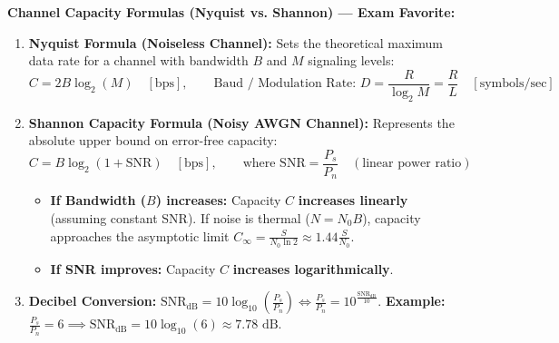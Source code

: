 \documentclass[10pt,a4paper]{article}
\begin{document}
\begin{tcolorbox}[
    colframe=accentgreen,
    colback=white,
    arc=1.2mm,
    boxrule=0.5pt,
    left=5pt, right=5pt, top=2.5pt, bottom=2.5pt
]
\textbf{Channel Capacity Formulas (Nyquist vs. Shannon) --- Exam Favorite:}
\begin{enumerate}[leftmargin=12pt, itemsep=1pt, topsep=1pt]
    \item \textbf{Nyquist Formula (Noiseless Channel):} Sets the theoretical maximum data rate for a channel with bandwidth $B$ and $M$ signaling levels:
    \[
    C = 2B \log_2(M) \quad [\text{bps}], \qquad \text{Baud / Modulation Rate: } D = \frac{R}{\log_2 M} = \frac{R}{L} \quad [\text{symbols/sec}]
    \]
    \item \textbf{Shannon Capacity Formula (Noisy AWGN Channel):} Represents the absolute upper bound on error-free capacity:
    \[
    C = B \log_2(1 + \text{SNR}) \quad [\text{bps}], \qquad \text{where } \text{SNR} = \frac{P_s}{P_n} \quad (\text{linear power ratio})
    \]
    \begin{itemize}[leftmargin=10pt, itemsep=0.5pt]
        \item \textbf{If Bandwidth ($B$) increases:} Capacity $C$ \textbf{increases linearly} (assuming constant SNR). If noise is thermal ($N = N_0 B$), capacity approaches the asymptotic limit $C_\infty = \frac{S}{N_0 \ln 2} \approx 1.44 \frac{S}{N_0}$.
        \item \textbf{If SNR improves:} Capacity $C$ \textbf{increases logarithmically}.
    \end{itemize}
    \item \textbf{Decibel Conversion:} $\text{SNR}_{\text{dB}} = 10 \log_{10}\left(\frac{P_s}{P_n}\right) \iff \frac{P_s}{P_n} = 10^{\frac{\text{SNR}_{\text{dB}}}{10}}$. \textbf{Example:} $\frac{P_s}{P_n} = 6 \implies \text{SNR}_{\text{dB}} = 10 \log_{10}(6) \approx 7.78\text{ dB}$.
\end{enumerate}
\end{tcolorbox}

\vspace{2pt}

\clearpage
{}\par\vspace{2pt}
\end{document}
